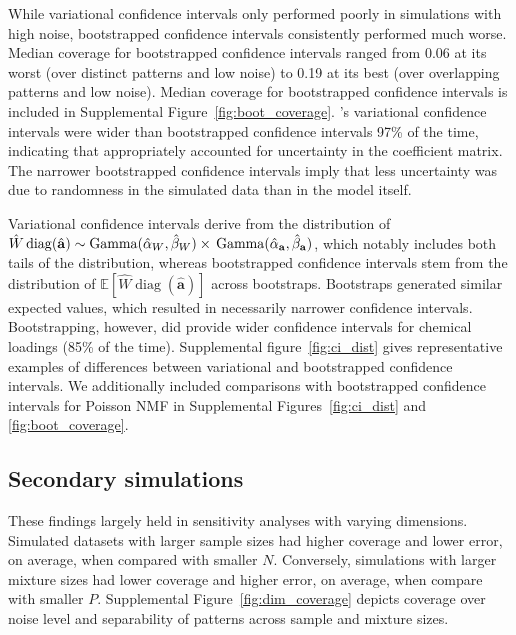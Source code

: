 While variational confidence intervals only performed poorly in simulations with high noise, bootstrapped confidence intervals consistently performed much worse. Median coverage for bootstrapped \bnmf confidence intervals ranged from 0.06 at its worst (over distinct patterns and low noise) to 0.19 at its best (over overlapping patterns and low noise). Median coverage for bootstrapped confidence intervals is included in Supplemental Figure~\ref{fig:boot_coverage}. \bnmfc's variational confidence intervals were wider than bootstrapped confidence intervals 97\% of the time, indicating that \bnmf appropriately accounted for uncertainty in the coefficient matrix. The narrower bootstrapped confidence intervals imply that less uncertainty was due to randomness in the simulated data than in the model itself.

Variational confidence intervals derive from the distribution of $\hat{W}\operatorname{diag}(\hat{\mathbf{a}}) \sim \operatorname{Gamma}(\hat{\alpha}_W, \hat{\beta}_W) \times \\ \operatorname{Gamma}(\hat{\alpha}_\mathbf{a}, \hat{\beta}_\mathbf{a})$, which notably includes both tails of the distribution, whereas bootstrapped confidence intervals stem from the distribution of $\mathbb{E}\left[\hat{W}\operatorname{diag}(\hat{\mathbf{a}})\right]$ across bootstraps. Bootstraps generated similar expected values, which resulted in necessarily narrower confidence intervals. Bootstrapping, however, did provide wider confidence intervals for chemical loadings (85\% of the time). Supplemental figure~\ref{fig:ci_dist} gives representative examples of differences between variational and bootstrapped confidence intervals. We additionally included comparisons with bootstrapped confidence intervals for Poisson NMF in Supplemental Figures~\ref{fig:ci_dist} and \ref{fig:boot_coverage}.

\subsection{Secondary simulations}
These findings largely held in sensitivity analyses with varying dimensions. Simulated datasets with larger sample sizes had higher coverage and lower error, on average, when compared with smaller $N$. Conversely, simulations with larger mixture sizes had lower coverage and higher error, on average, when compare with smaller $P$. Supplemental Figure~\ref{fig:dim_coverage} depicts \bnmf coverage over noise level and separability of patterns across sample and mixture sizes.

